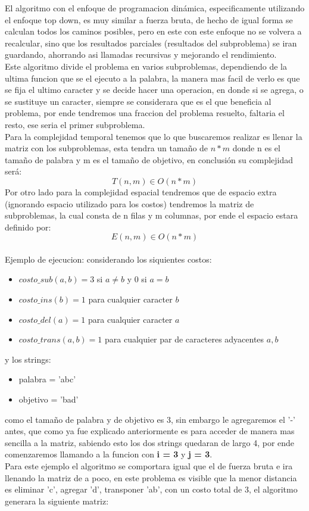 El algoritmo con el enfoque de programacion dinámica, especificamente utilizando el enfoque top down, es muy similar a fuerza bruta, de hecho de igual forma se calculan todos los caminos posibles, pero en este con este enfoque no se volvera a recalcular, sino que los resultados parciales (resultados del subproblema) se iran guardando, ahorrando asi llamadas recursivas y mejorando el rendimiento.\\
Este algoritmo divide el problema en varios subproblemas, dependiendo de la ultima funcion que se el ejecuto a la palabra, la manera mas facil de verlo es que se fija el ultimo caracter y se decide hacer una operacion, en donde si se agrega, o se sustituye un caracter, siempre se considerara que es el que beneficia al problema, por ende tendremos una fraccion del problema resuelto, faltaria el resto, ese seria el primer subproblema.\\
Para la complejidad temporal tenemos que lo que buscaremos realizar es llenar la matriz con los subproblemas, esta tendra un tamaño de $n*m$ donde n es el tamaño de palabra y m es el tamaño de objetivo, en conclusión su complejidad será:
\[
    T(n,m) \in O(n*m)
\]
Por otro lado para la complejidad espacial tendremos que de espacio extra (ignorando espacio utilizado para los costos) tendremos la matriz de subproblemas, la cual consta de n filas y m columnas, por ende el espacio estara definido por:
\[
    E(n,m) \in  O(n*m)
\]
\\
Ejemplo de ejecucion:
considerando los siquientes costos:
\begin{itemize}
    \item $costo\_sub(a,b) = 3$ si $a \neq b$ y $0$ si $a = b$
    \item $costo\_ins(b) = 1$ para cualquier caracter $b$
    \item $costo\_del(a) = 1$ para cualquier caracter $a$
    \item $costo\_trans(a,b) = 1$ para cualquier par de caracteres adyacentes $a, b$\\
\end{itemize} 
y los strings:
\begin{itemize}
    \item palabra = 'abc'
    \item objetivo = 'bad'\\
\end{itemize} 

como el tamaño de palabra y de objetivo es 3, sin embargo le agregaremos el '-' antes, que como ya fue explicado anteriormente es para acceder de manera mas sencilla a la matriz, sabiendo esto los dos strings quedaran de largo 4, por ende comenzaremos llamando a la funcion con \textbf{i = 3} y \textbf{j = 3}.\\ 
Para este ejemplo el algoritmo se comportara igual que el de fuerza bruta e ira llenando la matriz de a poco, en este problema es visible que la menor distancia es eliminar 'c', agregar 'd', transponer 'ab', con un costo total de 3, el algoritmo generara la siguiente matriz:

